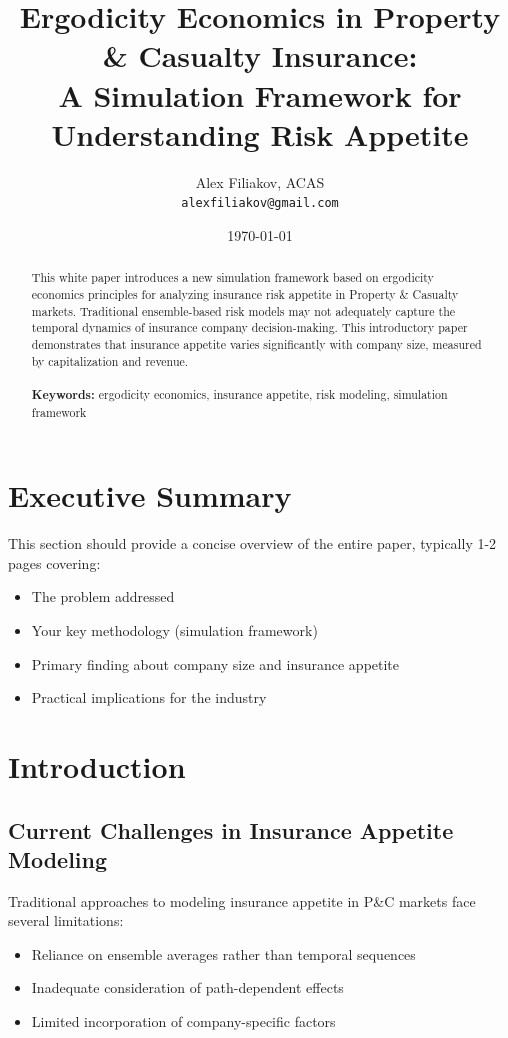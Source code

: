 \documentclass[11pt,letterpaper]{article}
\title{\Large \textbf{Ergodicity Economics in Property \& Casualty Insurance: \\
A Simulation Framework for Understanding Risk Appetite}}
\author{Alex Filiakov, ACAS\\
\texttt{alexfiliakov@gmail.com}}
\date{\today}
\begin{document}
\maketitle

\begin{abstract}
This white paper introduces a new simulation framework based on ergodicity economics principles for analyzing insurance risk appetite in Property \& Casualty markets. Traditional ensemble-based risk models may not adequately capture the temporal dynamics of insurance company decision-making. This introductory paper demonstrates that insurance appetite varies significantly with company size, measured by capitalization and revenue.
\\\\
\textbf{Keywords:} ergodicity economics, insurance appetite, risk modeling, simulation framework
\end{abstract}

\newpage
\tableofcontents
\newpage

\section{Executive Summary}

This section should provide a concise overview of the entire paper, typically 1-2 pages covering:
\begin{itemize}
    \item The problem addressed
    \item Your key methodology (simulation framework)
    \item Primary finding about company size and insurance appetite
    \item Practical implications for the industry
\end{itemize}


\section{Introduction}

\subsection{Current Challenges in Insurance Appetite Modeling}

Traditional approaches to modeling insurance appetite in P\&C markets face several limitations:
\begin{itemize}
    \item Reliance on ensemble averages rather than temporal sequences
    \item Inadequate consideration of path-dependent effects
    \item Limited incorporation of company-specific factors
\end{itemize}
\end{document}

